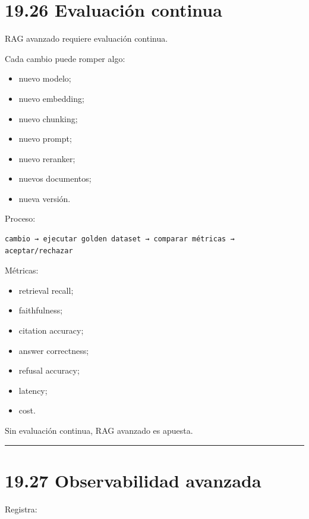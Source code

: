 \section{19.26 Evaluación continua}\label{evaluaciuxf3n-continua}

RAG avanzado requiere evaluación continua.

Cada cambio puede romper algo:

\begin{itemize}
\tightlist
\item
  nuevo modelo;
\item
  nuevo embedding;
\item
  nuevo chunking;
\item
  nuevo prompt;
\item
  nuevo reranker;
\item
  nuevos documentos;
\item
  nueva versión.
\end{itemize}

Proceso:

\begin{lstlisting}
cambio → ejecutar golden dataset → comparar métricas → aceptar/rechazar
\end{lstlisting}

Métricas:

\begin{itemize}
\tightlist
\item
  retrieval recall;
\item
  faithfulness;
\item
  citation accuracy;
\item
  answer correctness;
\item
  refusal accuracy;
\item
  latency;
\item
  cost.
\end{itemize}

Sin evaluación continua, RAG avanzado es apuesta.

\begin{center}\rule{0.5\linewidth}{0.5pt}\end{center}

\section{19.27 Observabilidad avanzada}\label{observabilidad-avanzada}

Registra:

